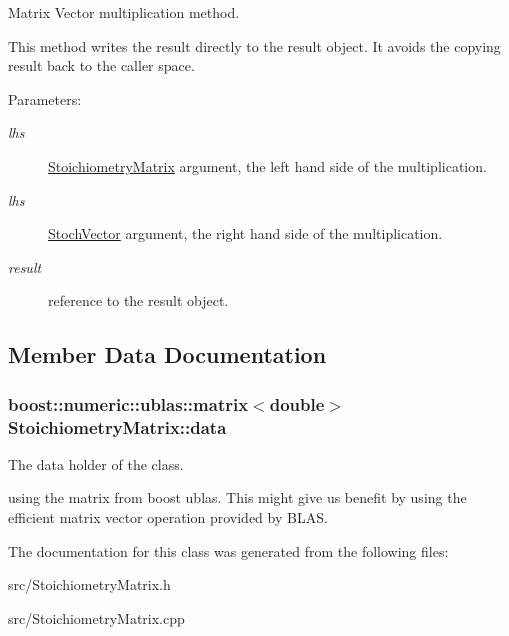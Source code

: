 Matrix Vector multiplication method. 

This method writes the result directly to the result object. It avoids the copying result back to the caller space. \begin{Desc}
\item[Parameters:]
\begin{description}
\item[{\em lhs}]\hyperlink{class_stoichiometry_matrix}{StoichiometryMatrix} argument, the left hand side of the multiplication. \item[{\em lhs}]\hyperlink{class_stoch_vector}{StochVector} argument, the right hand side of the multiplication. \item[{\em result}]reference to the result object. \end{description}
\end{Desc}


\subsection{Member Data Documentation}
\hypertarget{class_stoichiometry_matrix_26e7f2350a2b33fa2c02db5b5098a4f0}{
\subsubsection{\setlength{\rightskip}{0pt plus 5cm}boost::numeric::ublas::matrix$<$double$>$ {\bf StoichiometryMatrix::data}}}
\label{class_stoichiometry_matrix_26e7f2350a2b33fa2c02db5b5098a4f0}


The data holder of the class. 

using the matrix from boost ublas. This might give us benefit by using the efficient matrix vector operation provided by BLAS. 

The documentation for this class was generated from the following files:\begin{CompactItemize}
\item 
src/StoichiometryMatrix.h\item 
src/StoichiometryMatrix.cpp\end{CompactItemize}
